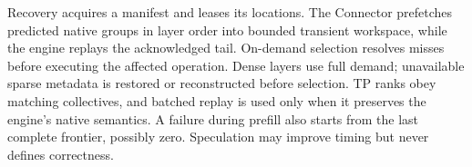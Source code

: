 Recovery acquires a manifest and leases its locations. The Connector
prefetches predicted native groups in layer order into bounded transient
workspace, while the engine replays the acknowledged tail. On-demand
selection resolves misses before executing the affected operation. Dense
layers use full demand; unavailable sparse metadata is restored or
reconstructed before selection. TP ranks obey matching collectives, and
batched replay is used only when it preserves the engine's native
semantics. A failure during prefill also starts from the last complete frontier,
possibly zero. Speculation may improve timing but never defines correctness.


